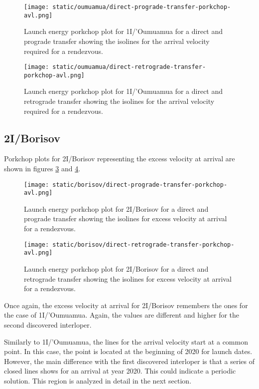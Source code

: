 \newpage
\begin{figure}[H]
  \centering
  \texttt{[image: static/oumuamua/direct-prograde-transfer-porkchop-avl.png]}
  \caption[Direct and prograde launch energy porkchop for 1I/'Oumuamua]{Launch energy porkchop plot for 1I/'Oumuamua for a direct and prograde transfer showing the isolines for the arrival velocity required for a rendezvous.}
  \label{fig:oumuamua-direct-prograde-transfer-porkchop-avl}
\end{figure}

\begin{figure}[H]
  \centering
  \texttt{[image: static/oumuamua/direct-retrograde-transfer-porkchop-avl.png]}
  \caption[Direct and prograde launch energy porkchop for
    1I/'Oumuamua]{Launch energy porkchop plot for 1I/'Oumuamua for a direct and
    retrograde transfer showing the isolines for the arrival velocity required for a rendezvous.}
  \label{fig:oumuamua-direct-retrograde-transfer-porkchop-avl}
\end{figure}

\subsection{2I/Borisov}

Porkchop plots for 2I/Borisov representing the excess velocity at arrival are
shown in figures \ref{fig:borisov-direct-prograde-transfer-porkchop-avl} and
\ref{fig:borisov-direct-retrograde-transfer-porkchop-avl}.

\begin{figure}[H]
  \centering
  \texttt{[image: static/borisov/direct-prograde-transfer-porkchop-avl.png]}
  \caption[Direct and prograde arrival excess velocity porkchop for
    2I/Borisov]{Launch energy porkchop plot for 2I/Borisov for a direct and
    prograde transfer showing the isolines for excess velocity at arrival
    for a rendezvous.}
  \label{fig:borisov-direct-prograde-transfer-porkchop-avl}
\end{figure}

\begin{figure}[H]
  \centering
  \texttt{[image: static/borisov/direct-retrograde-transfer-porkchop-avl.png]}
  \caption[Direct and retrograde arrival excess velocity porkchop for
    2I/Borisov]{Launch energy porkchop plot for 2I/Borisov for a direct and
    retrograde transfer showing the isolines for excess velocity at arrival
    for a rendezvous.}
  \label{fig:borisov-direct-retrograde-transfer-porkchop-avl}
\end{figure}

Once again, the excess velocity at arrival for 2I/Borisov remembers the ones for
the case of 1I/'Oumuamua. Again, the values are different and higher for the second
discovered interloper.

Similarly to 1I/'Oumuamua, the lines for the arrival velocity start at a common
point. In this case, the point is located at the beginning of 2020 for launch
dates. However, the main difference with the first discovered interloper is that
a series of closed lines shows for an arrival at year 2020. This could indicate
a periodic solution. This region is analyzed in detail in the next section.
